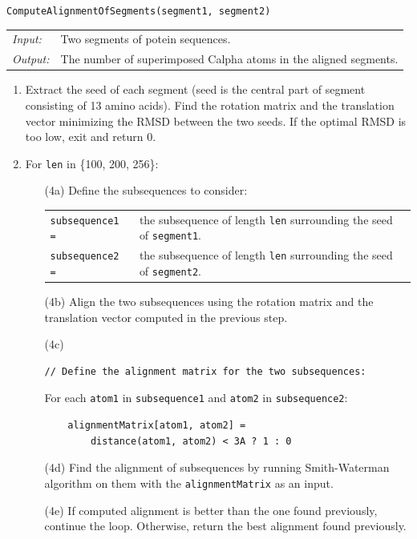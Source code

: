 \begin{algorithm}
\caption{\texttt{ComputeAlignmentOfSegments(segment1, segment2)}}

\begin{tabular}{lp{13.39cm}}
{\em Input:} &
Two segments of potein sequences.\\
{\em Output:} &
The number of superimposed Calpha atoms in the aligned segments.\\
\end{tabular}

\begin{enumerate}
\item
Extract the seed of each segment (seed is the central part of segment consisting of 13 amino acids).
Find the rotation matrix and the translation vector minimizing the RMSD between the two seeds.
If the optimal RMSD is too low, exit and return 0.

\item
For \texttt{len} in \{100, 200, 256\}:
\begin{itemize}
\item[(4a)]
Define the subsequences to consider:\\
\begin{tabular}{lp{8cm}}
\texttt{subsequence1 =} &
the subsequence of length \texttt{len} surrounding the seed of \texttt{segment1}. \\
\texttt{subsequence2 =} &
the subsequence of length \texttt{len} surrounding the seed of \texttt{segment2}. \\
\end{tabular}

\item[(4b)]
Align the two subsequences using the rotation matrix and the translation vector computed in the previous step.

\item[(4c)]
\begin{verbatim}
// Define the alignment matrix for the two subsequences:
\end{verbatim}
For each \texttt{atom1} in \texttt{subsequence1} and \texttt{atom2} in \texttt{subsequence2}:
\begin{verbatim}
    alignmentMatrix[atom1, atom2] = 
        distance(atom1, atom2) < 3A ? 1 : 0
\end{verbatim}

\item[(4d)]
Find the alignment of subsequences by running Smith-Waterman algorithm on them with the \texttt{alignmentMatrix} as an input.

\item[(4e)]
If computed alignment is better than the one found previously, continue the loop. Otherwise, return the best alignment found previously.

\end{itemize} 

\end{enumerate}
\end{algorithm}



